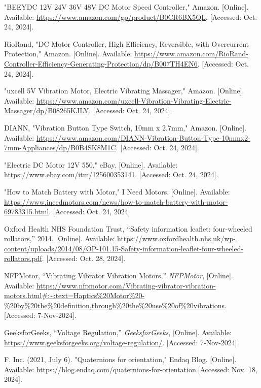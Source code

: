 \begin{thebibliography}{45}
	"BEEYDC 12V 24V 36V 48V DC Motor Speed Controller," Amazon. [Online]. Available: \url{https://www.amazon.com/gp/product/B0CR6BX5QL}. [Accessed: Oct. 24, 2024]. 
	
	RioRand, "DC Motor Controller, High Efficiency, Reversible, with Overcurrent Protection," Amazon. [Online]. Available: \url{https://www.amazon.com/RioRand-Controller-Efficiency-Generating-Protection/dp/B007TH4EN6}. [Accessed: Oct. 24, 2024]. 
	
	"uxcell 5V Vibration Motor, Electric Vibrating Massager," Amazon. [Online]. Available: \url{https://www.amazon.com/uxcell-Vibration-Vibrating-Electric-Massager/dp/B08265KJLY}. [Accessed: Oct. 24, 2024]. 
	
	DIANN, "Vibration Button Type Switch, 10mm x 2.7mm," Amazon. [Online]. Available: \url{https://www.amazon.com/DIANN-Vibration-Button-Type-10mmx2-7mm-Appliances/dp/B0B4SK8M1C}. [Accessed: Oct. 24, 2024]. 
	
	"Electric DC Motor 12V 550," eBay. [Online]. Available: \url{https://www.ebay.com/itm/125600353141}. [Accessed: Oct. 24, 2024]. 
	
	"How to Match Battery with Motor," I Need Motors. [Online]. Available: \url{https://www.ineedmotors.com/news/how-to-match-battery-with-motor-69783315.html}. [Accessed: Oct. 24, 2024]
	
	Oxford Health NHS Foundation Trust, ``Safety information leaflet: four-wheeled rollators,'' 2014. [Online]. Available: \url{https://www.oxfordhealth.nhs.uk/wp-content/uploads/2014/08/OP-101.15-Safety-information-leaflet-four-wheeled-rollators.pdf}. [Accessed: Oct. 28, 2024].
		 
	NFPMotor, ``Vibrating Vibrator Vibration Motors,'' \textit{NFPMotor}, [Online]. Available: \url{https://www.nfpmotor.com/Vibrating-vibrator-vibration-motors.html#:~:text=Haptics%20Motor%20-%20by%20the%20definition,through%20the%20use%20of%20vibrations}. [Accessed: 7-Nov-2024].
	
	GeeksforGeeks, ``Voltage Regulation,'' \textit{GeeksforGeeks}, [Online]. Available: \url{https://www.geeksforgeeks.org/voltage-regulation/}. [Accessed: 7-Nov-2024].
	
	 F. Inc. (2021, July 6). "Quaternions for orientation," Endaq Blog. [Online]. Available: https://blog.endaq.com/quaternions-for-orientation.[Accessed: Nov. 18, 2024].


\end{thebibliography}

